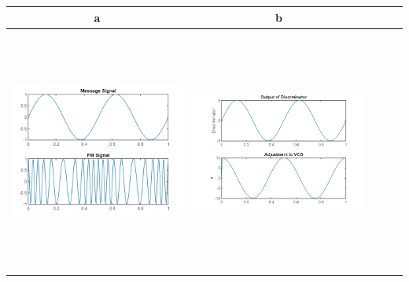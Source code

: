 \documentclass[12pt,a4paper]{article}%
\begin{document}
    \begin{tabular}{ccccc}
    	\toprule
    	a & b \\
    	\midrule
    	{\includegraphics[width=8cm,height=8cm]{./images/vco1.jpeg}} &
    	{\includegraphics[width=8cm,height=8cm]{./images/vco2.jpeg}} \\
    \end{tabular}
    \pagebreak
\end{document}
